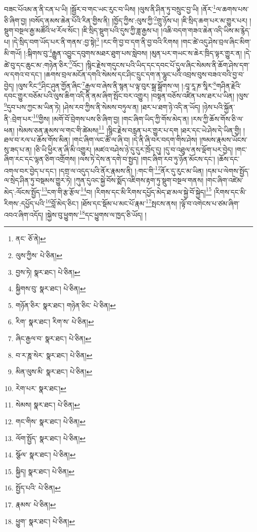 བཟང་པོའམ་ན་ནི་ངན་པ་ཡི། །སྦྱོར་བ་གང་ཡང་རུང་བ་ཡིས། །ལུས་ནི་ཤིན་ཏུ་བསྲུང་བྱ་ཡི། །ནོར་\footnote{ནང་  ཅོ་ནེ། }ལ་ཆགས་པས་ཅི་ཞིག་བྱ། །བསོད་ནམས་ཆེན་པོའི་རིན་གྱིས་ནི། །ཁྱོད་ཀྱིས་:ལུས་ཀྱི་\footnote{ལུས་ཀྱིས་  པེ་ཅིན། }གྲུ་ཉོས་པ། །ཇི་སྲིད་ཆག་པར་མ་གྱུར་པར། །སྡུག་བསྔལ་རྒྱ་མཚོའི་ཕ་རོལ་སོང་། །ཇི་སྲིད་སྡུག་པའི་དུས་ཀྱི་ཟླ་རྒྱས་པ། །འཆི་བདག་གཟའ་ཆེན་འདི་ཡིས་མ་རྙེད་པ། །དེ་སྲིད་བག་ཡོད་པར་ནི་གནས་:བྱ་སྟེ།\footnote{བྱས་ཏེ།  སྣར་ཐང་།  པེ་ཅིན། } །རང་གི་བྱ་བ་དག་ནི་བྱ་བའི་རིགས། །གང་ཚེ་འདུ་ཤེས་བྲལ་ཞིང་མིག་མི་གཡོ། །:སྐིགས་བུ་\footnote{སྐྱིགས་བུ་  སྣར་ཐང་།  པེ་ཅིན། }རྒྱུན་འབྱུང་དབུགས་མཐར་ཐུག་པས་སླེབས། །མུན་པར་གཡང་ས་ཆེར་ཁྲིད་ལྟར་གྱུར་ན། །དེ་ཚེ་བུ་དང་ཆུང་མ་:གཉེན་ཅིར་\footnote{གཉོན་ཅིར་  སྣར་ཐང་། གཉེན་ཅིང་  པེ་ཅིན། }འོང་། །སྙིང་རྗེས་གདུངས་པའི་ཡིད་དང་དབང་པོ་དུལ་ཞིང་སེམས་ནི་ཆོག་ཤེས་དག་ལ་དགའ་བ་དང་། །ཆགས་བྲལ་མངོན་དགའི་སེམས་དང་ཤིང་དྲུང་དག་ན་ལྷུང་པའི་འབྲས་བུས་བཟའ་བའི་བྱ་བ་བྱེད། །ལུས་རིང་\footnote{རིག་  སྣར་ཐང་། རིག་ས་  པེ་ཅིན། }ཤིང་ཤུན་གྱོན་ཞིང་\footnote{ཞིང་རྒྱལ་བ་  སྣར་ཐང་།  པེ་ཅིན། }རྒྱལ་བ་ཞེས་ནི་སྙན་པ་ལྟ་བུར་སྒྲ་སྒྲོགས་ལ། །:བཱ་རཱ་ཎ་སཱིར་\footnote{བ་ར་ཎཱ་སེར་  སྣར་ཐང་།  པེ་ཅིན། }གཤིན་རྗེའི་དབང་གྱུར་བཅོམ་པའི་ལུས་ཆིག་འདི་ནི་ནམ་ཞིག་སྤོང་བར་འགྱུར། །བསྟན་བཅོས་འཛིན་པས་ཐར་པ་ཡིན། །ལུས་\footnote{མིན་ལུས་མི་  སྣར་ཐང་།  པེ་ཅིན། }དུབ་པས་ཀྱང་མ་ཡིན་ཏེ། །ཤེས་རབ་ཀྱིས་ནི་སེམས་བཏུལ་ན། །ཐར་པ་ཐག་ཉེ་འདི་ན་ཡོད། །ཉེས་པའི་སྐྱོན་ནི་:བྲེག་པར་\footnote{རེག་པར་  སྣར་ཐང་། }གྱིས། །མགོ་བོ་བྲེགས་པས་ཅི་ཞིག་བྱ། །གང་ཞིག་ཡིད་ཀྱི་གོས་མེད་ན། །རས་ཀྱི་ཆོས་གོས་ཅི་ལ་ཕན། །སེམས་ཅན་རྣམས་ལ་གང་གི་ཚེམས།\footnote{སེམས།  སྣར་ཐང་།  པེ་ཅིན། } །སྙིང་རྗེས་བརླན་པར་གྱུར་པ་དག །ཐར་དང་ཡེ་ཤེས་དེ་ཡིན་གྱི། །ཐལ་བ་རལ་པ་ཆོས་གོས་མིན། །གང་ཞིག་ལང་ཚོ་ལ་ཞི་བ། །དེ་ནི་ཞི་བར་བདག་གིས་ཤེས། །ཁམས་རྣམས་ཡོངས་སུ་ཟད་པ་ན། །ཅི་ཡི་ཕྱིར་ན་ཞི་མི་འགྱུར། །མཛའ་བཤེས་ཉེ་དུ་དུར་ཁྲོད་དུ། །དུ་བ་འཐུལ་ནས་ལྡོག་པར་བྱེད། །གང་ཞིག་རང་དང་ལྷན་ཅིག་འགྲོགས། །ལས་ཏེ་དེས་ན་དགེ་བ་སྤྱད། །གང་ཞིག་རབ་ཏུ་ཉོན་མོངས་དང་། །ཆོས་དང་འགལ་བར་བྱེད་པ་དང་། །དགྲ་ལ་འདུད་པའི་ནོར་རྣམས་ནི། །:གང་གི་\footnote{གང་གིས་  སྣར་ཐང་།  པེ་ཅིན། }ནོར་དུ་རུང་མ་ཡིན། །དམ་པ་ལེགས་སྤྱོད་ལ་སྲེད་ཤིན་ཏུ་བསྡམས་གྱུར་ཏེ། །ཀུན་དུའང་སྐྱེ་བོས་སྨོད་འཇིགས་རྟག་ཏུ་སྡུག་བསྔལ་གནས། །གང་ཞིག་འཛེམ་མེད་:ལོངས་སྤྱོད་\footnote{ལོག་སྤྱོད་  སྣར་ཐང་།  པེ་ཅིན། }ངག་གི་རྩ་རྩོལ་\footnote{སྩོལ་  སྣར་ཐང་།  པེ་ཅིན། }བ། །རིགས་དང་མི་རིགས་དཔྱོད་མེད་ཐ་མལ་སྐྱེ་བོ་སྐྱེད།\footnote{སྐྱིད།  སྣར་ཐང་།  པེ་ཅིན། } །རིགས་དང་མི་རིགས་:དཔྱོད་པའི་\footnote{སྤྱོད་པའི་  པེ་ཅིན། }བློ་མེད་ཅིང་། །ཐོས་དང་སྡོམ་པ་མང་པོ་རྣམ་\footnote{རྣམས་  པེ་ཅིན། }སྤངས་ནས། །ལྟོ་བ་འགེངས་པ་ཙམ་ཞིག་འབའ་ཞིག་འདོད། །སྐྱེས་བུ་ཕྱུགས་\footnote{ཕྱུག་  སྣར་ཐང་།  པེ་ཅིན། }དང་ཕྱུགས་ལ་ཁྱད་ཅི་ཡོད། །
